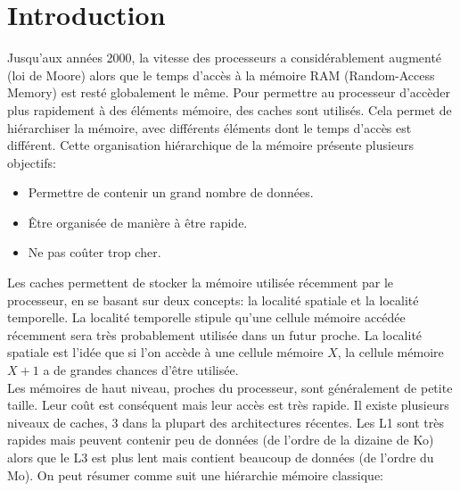 \documentclass[a4paper]{article}
\begin{document}


\newpage
\tableofcontents

\newpage
\section*{Introduction}

\indent Jusqu'aux années 2000, la vitesse des processeurs a considérablement augmenté (loi de Moore) alors que le temps d'accès à la mémoire RAM (Random-Access Memory) est resté globalement le même. Pour permettre au processeur d'accèder plus rapidement à des éléments mémoire, des caches sont utilisés. Cela permet de hiérarchiser la mémoire, avec différents éléments dont le temps d'accès est différent. Cette organisation hiérarchique de la mémoire présente plusieurs objectifs: \\
\begin{itemize}
\item Permettre de contenir un grand nombre de données.
\item \^Etre organisée de manière à être rapide.
\item Ne pas coûter trop cher. \\
\end{itemize}

\indent Les caches permettent de stocker la mémoire utilisée récemment par le processeur, en se basant sur deux concepts: la localité spatiale et la localité temporelle. La localité temporelle stipule qu'une cellule mémoire accédée récemment sera très probablement utilisée dans un futur proche. La localité spatiale est l'idée que si l'on accède à une cellule mémoire $X$, la cellule mémoire $X+1$ a de grandes chances d'être utilisée. \\

\indent Les mémoires de haut niveau, proches du processeur, sont généralement de petite taille. Leur coût est conséquent mais leur accès est très rapide. Il existe plusieurs niveaux de caches, $3$ dans la plupart des architectures récentes. Les L1 sont très rapides mais peuvent contenir peu de données (de l'ordre de la dizaine de Ko) alors que le L3 est plus lent mais contient beaucoup de données (de l'ordre du Mo). On peut résumer comme suit une hiérarchie mémoire classique: \\
\end{document}
